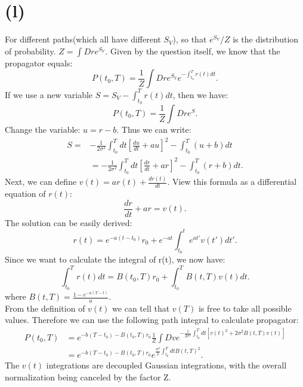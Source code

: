 \documentclass[12pt,a4paper]{paper}
\begin{document}
\section{(l)}
\indent For different paths(which all have different $S_{V}$), so that ${e^{S_{V}}/Z}$ is the distribution of probability. $Z=\int Dr e^{S_{V}}.$
\indent Given by the question itself, we know that the propagator equals:
\begin{equation}
P(t_{0},T)=\frac{1}{Z}\int Dr e^{S_{V}} e^{-\int_{t_{0}}^{T} r(t)dt}.
\end{equation}
\indent If we use a new variable $S=S_{V}-\int_{t_{0}}^{T} r(t)dt$, then we have:
\begin{equation}
P(t_{0},T)=\frac{1}{Z}\int Dr e^{S}.
\end{equation}
\indent Change the variable: $u=r-b$. Thus we can write:
\begin{align*}
S=&-\frac{1}{2\sigma ^2}\int_{t_{0}}^{T}dt[\frac{du}{dt}+au]^2 -\int_{t_{0}}^{T}(u+b)dt\\
& =-\frac{1}{2\sigma ^2}\int_{t_{0}}^{T}dt[\frac{dr}{dt}+ar]^2 -\int_{t_{0}}^{T}(r+b)dt.
\end{align*}
\indent Next, we can define $v(t)=ar(t)+\frac{dr(t)}{dt}$. View this formula as a differential equation of $r(t)$:
\begin{equation}
\frac{dr}{dt}+ar=v(t).
\end{equation}
The solution can be easily derived:
\begin{equation}
r(t)=e^{-a(t-t_{0})}r_{0}+e^{-at}\int_{t_{0}}^{t}e^{a{t}'}v({t}')d{t}'.
\end{equation}
\indent Since we want to calculate the integral of r(t), we now have:
\begin{equation}
\int_{t_{0}}^{T}r(t)dt=B(t_{0},T)r_{0} + \int_{t_{0}}^{T} B(t,T)v(t)dt.
\end{equation}
where $B(t,T)=\frac{1-e^{-a(T-t)}}{a}$.\\
\indent From the definition of $v(t)$ we can tell that $v(T)$ is free to take all possible values. Therefore we can use the following path integral to calculate propagator:
\begin{align*}
P(t_{0}, T) &=e^{-b(T-t_{0})-B(t_{0},T)r_{0}} \frac{1}{Z}\int Dv e^{-\frac{1}{2\sigma ^2}\int_{t_0}^{T}dt[v(t)^2 + 2\sigma ^2 B(t,T)v(t)]}\\
& =e^{-b(T-t_{0})-B(t_{0},T)r_{0}} e^{\frac{\sigma ^2}{2}\int_{t_{0}}^{T}dt B(t,T)^2}.
\end{align*}
\indent The $v(t)$ integrations are decoupled Gaussian integrations, with the overall normalization being canceled by the factor Z.\\
\end{document}
